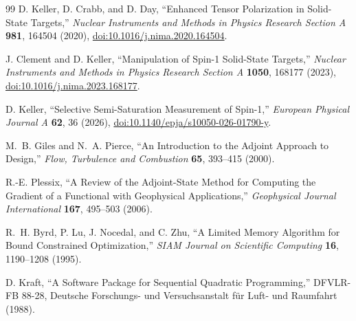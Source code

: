 \documentclass[11pt]{article}
\begin{document}
\begin{thebibliography}{99}
D. Keller, D. Crabb, and D. Day,
``Enhanced Tensor Polarization in Solid-State Targets,''
\emph{Nuclear Instruments and Methods in Physics Research Section A} \textbf{981}, 164504 (2020),
\href{https://doi.org/10.1016/j.nima.2020.164504}{doi:10.1016/j.nima.2020.164504}.

J. Clement and D. Keller,
``Manipulation of Spin-1 Solid-State Targets,''
\emph{Nuclear Instruments and Methods in Physics Research Section A} \textbf{1050}, 168177 (2023),
\href{https://doi.org/10.1016/j.nima.2023.168177}{doi:10.1016/j.nima.2023.168177}.

D. Keller,
``Selective Semi-Saturation Measurement of Spin-1,''
\emph{European Physical Journal A} \textbf{62}, 36 (2026),
\href{https://doi.org/10.1140/epja/s10050-026-01790-y}{doi:10.1140/epja/s10050-026-01790-y}.

M.~B. Giles and N.~A. Pierce,
``An Introduction to the Adjoint Approach to Design,''
\emph{Flow, Turbulence and Combustion} \textbf{65}, 393--415 (2000).

R.-E. Plessix,
``A Review of the Adjoint-State Method for Computing the Gradient of a Functional with Geophysical Applications,''
\emph{Geophysical Journal International} \textbf{167}, 495--503 (2006).

R.~H. Byrd, P. Lu, J. Nocedal, and C. Zhu,
``A Limited Memory Algorithm for Bound Constrained Optimization,''
\emph{SIAM Journal on Scientific Computing} \textbf{16}, 1190--1208 (1995).

D. Kraft,
``A Software Package for Sequential Quadratic Programming,''
DFVLR-FB 88-28, Deutsche Forschungs- und Versuchsanstalt f\"ur Luft- und Raumfahrt (1988).

\end{thebibliography}
\end{document}
